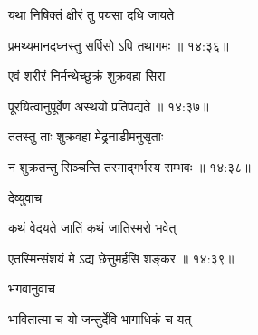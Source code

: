 {\devanagarifont यथा निषिक्तं क्षीरं तु पयसा दधि जायते \thinspace{\dandab} \dontdisplaylinenum }%


{\devanagarifont प्रमथ्यमानदध्नस्तु सर्पिसो ऽपि तथागमः {॥ १४:३६॥} \veg\dontdisplaylinenum }%

{\devanagarifont एवं शरीरं निर्मन्थेच्छुक्रं शुक्रवहा सिरा \thinspace{\dandab} \dontdisplaylinenum }%


{\devanagarifont पूरयित्वानुपूर्वेण अस्थयो प्रतिपद्यते {॥ १४:३७॥} \veg\dontdisplaylinenum }%

{\devanagarifont ततस्तु ताः शुक्रवहा मेढ्रनाडीमनुसृताः \thinspace{\dandab} \dontdisplaylinenum }%


{\devanagarifont न शुक्रतन्तु सिञ्चन्ति तस्माद्गर्भस्य सम्भवः {॥ १४:३८॥} \veg\dontdisplaylinenum }%

{\devanagarifont देव्युवाच {\dandab}\dontdisplaylinenum  }%
 
{\devanagarifont कथं वेदयते जातिं कथं जातिस्मरो भवेत् \thinspace{\danda} \dontdisplaylinenum }%


{\devanagarifont एतस्मिन्संशयं मे ऽद्य छेत्तुमर्हसि शङ्कर {॥ १४:३९॥} \veg\dontdisplaylinenum }%
 
{\devanagarifont भगवानुवाच {\dandab}\dontdisplaylinenum  }%
 
{\devanagarifont भावितात्मा च यो जन्तुर्देवि भागाधिकं च यत् \thinspace{\danda} \dontdisplaylinenum }%


